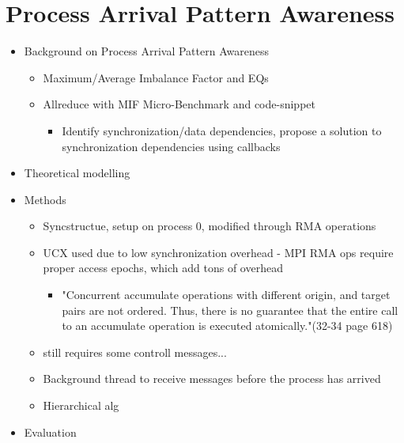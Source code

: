 
\glsresetall %
\chapter[PAPAwareness]{Process Arrival Pattern Awareness}\label{ch:PAPAwareness}

\begin{itemize}
    \item Background on Process Arrival Pattern Awareness
    \begin{itemize}
        \item Maximum/Average Imbalance Factor and EQs
        \item Allreduce with MIF Micro-Benchmark and code-snippet
        \begin{itemize}
            \item Identify synchronization/data dependencies, propose a solution to synchronization dependencies using callbacks \cite{Luo2018ADAPT}
        \end{itemize}
    \end{itemize}
    \item Theoretical modelling
    \item Methods
    \begin{itemize}
        \item Syncstructue, setup on process 0, modified through RMA operations
        \item UCX used due to low synchronization overhead - MPI RMA ops require proper access epochs, which add tons of overhead
        \begin{itemize}
            \item "Concurrent accumulate operations with different origin, and target pairs are
not ordered. Thus, there is no guarantee that the entire call to an accumulate operation is
executed atomically."(32-34 page 618)
        \end{itemize}
        \item still requires some controll messages... 
        \item Background thread to receive messages before the process has arrived 
        \item Hierarchical alg 
    \end{itemize}
    \item Evaluation
    \begin{itemize}

\end{itemize}
\end{itemize}
